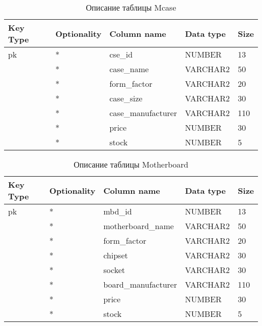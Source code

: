 \begin{xltabular}{\textwidth}{|X|X|p{4.0cm}|X|X|}
	\caption{Описание таблицы Mcase\label{tab:case}}\\
	\hline
	Key Type & Optionality & Column name & Data type & Size \\ \hline
	pk & * & cse\_id & NUMBER & 13 \\ \hline
	& * & case\_name & VARCHAR2 & 50 \\ \hline
	& * & form\_factor & VARCHAR2 & 20 \\ \hline
	& * & case\_size & VARCHAR2 & 30 \\ \hline
	& * & case\_manufacturer & VARCHAR2 & 110 \\ \hline
	& * & price & NUMBER & 30 \\ \hline
	& * & stock & NUMBER & 5 \\ \hline
\end{xltabular}

\begin{xltabular}{\textwidth}{|X|X|p{4.0cm}|X|X|}
	\caption{Описание таблицы Motherboard\label{tab:motherboard}}\\
	\hline
	Key Type & Optionality & Column name & Data type & Size \\ \hline
	pk & * & mbd\_id & NUMBER & 13 \\ \hline
	& * & motherboard\_name & VARCHAR2 & 50 \\ \hline
	& * & form\_factor & VARCHAR2 & 20 \\ \hline
	& * & chipset & VARCHAR2 & 30 \\ \hline
	& * & socket & VARCHAR2 & 30 \\ \hline
	& * & board\_manufacturer & VARCHAR2 & 110 \\ \hline
	& * & price & NUMBER & 30 \\ \hline
	& * & stock & NUMBER & 5 \\ \hline
\end{xltabular}

\newpage

